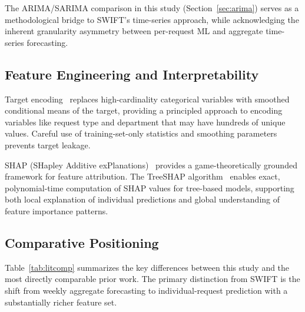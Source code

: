\documentclass[sigconf,nonacm]{acmart}
\begin{document}
The ARIMA/SARIMA comparison in this study
(Section~\ref{sec:arima}) serves as a methodological bridge to
SWIFT's time-series approach, while acknowledging the inherent
granularity asymmetry between per-request ML and aggregate
time-series forecasting.

\subsection{Feature Engineering and Interpretability}

Target encoding~\cite{micci2001target} replaces high-cardinality
categorical variables with smoothed conditional means of the
target, providing a principled approach to encoding variables like
request type and department that may have hundreds of unique
values. Careful use of training-set-only statistics and smoothing
parameters prevents target leakage.

SHAP (SHapley Additive exPlanations)~\cite{lundberg2017shap}
provides a game-theoretically grounded framework for feature
attribution. The TreeSHAP algorithm~\cite{lundberg2020treeshap}
enables exact, polynomial-time computation of SHAP values for
tree-based models, supporting both local explanation of individual
predictions and global understanding of feature importance
patterns.

\subsection{Comparative Positioning}

Table~\ref{tab:litcomp} summarizes the key differences between
this study and the most directly comparable prior work. The
primary distinction from SWIFT is the shift from weekly aggregate
forecasting to individual-request prediction with a substantially
richer feature set.
\end{document}
